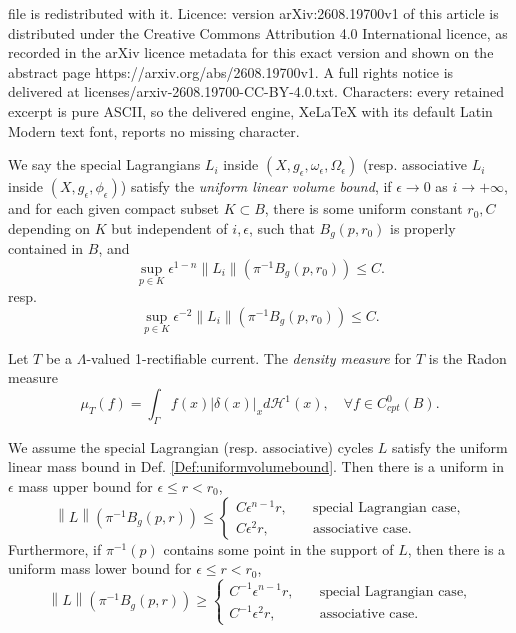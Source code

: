 \documentclass[10pt,a4paper]{amsart}
\newcommand{\R}{\mathbb{R}}
\newcommand{\norm}[1]{\left\lVert#1\right\rVert}
\begin{document}
file is redistributed with it. Licence: version arXiv:2608.19700v1 of this article is distributed under the Creative Commons Attribution 4.0 International licence, as recorded in the arXiv licence metadata for this exact version and shown on the abstract page https://arxiv.org/abs/2608.19700v1. A full rights notice is delivered at licenses/arxiv-2608.19700-CC-BY-4.0.txt. Characters: every retained excerpt is pure ASCII, so the delivered engine, XeLaTeX with its default Latin Modern text font, reports no missing character.
	\begin{Def}\label{Def:uniformvolumebound}
	We say the special Lagrangians $L_i$ inside $(X, g_\epsilon, \omega_\epsilon, \Omega_\epsilon)$ (resp. associative $L_i$ inside $(X, g_\epsilon, \phi_\epsilon)$) satisfy the \emph{uniform linear	volume bound}, if $\epsilon \to 0 $ as $i\to +\infty$, and 
	for each given compact subset $K\subset B$, there is 
	some uniform constant $r_0, C$ depending on $K$ but independent of $i,\epsilon$, such that $B_g(p, r_0)$ is properly contained in $B$, and 
	\begin{equation}
\sup_{   p\in K }	\epsilon^{1-n} \norm{L_i} (  \pi^{-1} B_g(p, r_0)   ) \leq C.
	\end{equation}
	resp. 
	\[
	\sup_{p\in K }	\epsilon^{-2} \norm{L_i}( \pi^{-1} B_g(p, r_0)   ) \leq C.
	\]
	\end{Def}

\begin{Def}\label{Def:gradientcycle}
Let $T$ be a $\Lambda$-valued 1-rectifiable current. %
The \emph{density measure} for $T$ is the Radon measure 
\[
\mu_T (f)= \int_\Gamma f(x) |\delta(x)|_x d\mathcal{H}^1 (x),\quad \forall f\in C^0_{cpt}(B).
\]

\end{Def}

		\begin{cor}\label{cor:volumebound}
		
We assume the special Lagrangian (resp. associative) cycles $L$ satisfy the uniform linear mass bound in Def. \ref{Def:uniformvolumebound}. Then there is a uniform in $\epsilon$ mass upper bound for $\epsilon\leq r<r_0$,
		\[
		\norm{L}( \pi^{-1}B_g(p, r) ) \leq \begin{cases}
			C\epsilon^{n-1}r ,\quad &\text{special Lagrangian case},
			\\
		C	\epsilon^2 r,\quad  & \text{associative case}.
		\end{cases}
		\]
		Furthermore, if $\pi^{-1}(p)$ contains some point in the support of $L$, then there is a uniform mass lower bound for $\epsilon\leq r<r_0$,
		\[
		\norm{L}( \pi^{-1}B_g(p, r) ) \geq \begin{cases}
			C^{-1}\epsilon^{n-1} r ,\quad &\text{special Lagrangian case},
			\\
			C^{-1}	\epsilon^2r ,\quad  & \text{associative case}.
		\end{cases}
		\]
		\end{cor}
\end{document}
